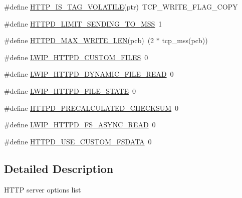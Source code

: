 \begin{DoxyCompactItemize}
\item 
\#define \hyperlink{group__httpd__opts_ga662e88120b507426374dd8ebbd54a048}{H\+T\+T\+P\+\_\+\+I\+S\+\_\+\+T\+A\+G\+\_\+\+V\+O\+L\+A\+T\+I\+LE}(ptr)~T\+C\+P\+\_\+\+W\+R\+I\+T\+E\+\_\+\+F\+L\+A\+G\+\_\+\+C\+O\+PY
\item 
\#define \hyperlink{group__httpd__opts_ga5410b604b135deaf5efc472dd7ab9d88}{H\+T\+T\+P\+D\+\_\+\+L\+I\+M\+I\+T\+\_\+\+S\+E\+N\+D\+I\+N\+G\+\_\+\+T\+O\+\_\+M\+SS}~1
\item 
\#define \hyperlink{group__httpd__opts_ga9faa2c18e1963ab5dfae826f6ee6d874}{H\+T\+T\+P\+D\+\_\+\+M\+A\+X\+\_\+\+W\+R\+I\+T\+E\+\_\+\+L\+EN}(pcb)~(2 $\ast$ tcp\+\_\+mss(pcb))
\item 
\#define \hyperlink{group__httpd__opts_gadadb70f5663cdf004bf879e3b5d326bd}{L\+W\+I\+P\+\_\+\+H\+T\+T\+P\+D\+\_\+\+C\+U\+S\+T\+O\+M\+\_\+\+F\+I\+L\+ES}~0
\item 
\#define \hyperlink{group__httpd__opts_ga1ee8d7c975c7e3d1c9d9dd9b43660c79}{L\+W\+I\+P\+\_\+\+H\+T\+T\+P\+D\+\_\+\+D\+Y\+N\+A\+M\+I\+C\+\_\+\+F\+I\+L\+E\+\_\+\+R\+E\+AD}~0
\item 
\#define \hyperlink{group__httpd__opts_gaedd0fa3d356170d8ca3557acb410fd7c}{L\+W\+I\+P\+\_\+\+H\+T\+T\+P\+D\+\_\+\+F\+I\+L\+E\+\_\+\+S\+T\+A\+TE}~0
\item 
\#define \hyperlink{group__httpd__opts_ga6e5de8515c89af12277e4cb011165103}{H\+T\+T\+P\+D\+\_\+\+P\+R\+E\+C\+A\+L\+C\+U\+L\+A\+T\+E\+D\+\_\+\+C\+H\+E\+C\+K\+S\+UM}~0
\item 
\#define \hyperlink{group__httpd__opts_ga51cb673cb5cc362acc409f23c1e0a331}{L\+W\+I\+P\+\_\+\+H\+T\+T\+P\+D\+\_\+\+F\+S\+\_\+\+A\+S\+Y\+N\+C\+\_\+\+R\+E\+AD}~0
\item 
\#define \hyperlink{group__httpd__opts_gafd16fcfb798be426cc87611772ba437c}{H\+T\+T\+P\+D\+\_\+\+U\+S\+E\+\_\+\+C\+U\+S\+T\+O\+M\+\_\+\+F\+S\+D\+A\+TA}~0
\end{DoxyCompactItemize}


\subsection{Detailed Description}
H\+T\+TP server options list 